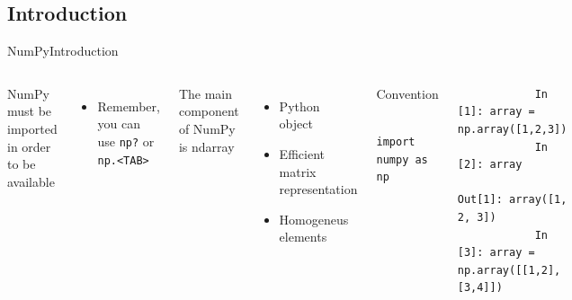 \documentclass[10pt,compress]{beamer} %
\begin{document}
\subsection{Introduction}
\begin{frame}[fragile]{NumPy}{Introduction}
	\begin{columns}
		NumPy must be imported in order to be available
		\begin{itemize}
			\item Remember, you can use \texttt{np?} or \texttt{np.<TAB>}
		\end{itemize}

		The main component of NumPy is \alert{ndarray}
		\begin{itemize}
			\item Python object
			\item Efficient matrix representation
			\item Homogeneus elements
		\end{itemize}

		\begin{block}{\footnotesize{Convention}}
		\vspace{-0.2cm} 
			\begin{lstlisting}
			import numpy as np
			\end{lstlisting}
		\vspace{-0.2cm} 
		\end{block}

		\begin{exampleblock}{}
		\vspace{-0.2cm} 
			\begin{lstlisting}
			In [1]: array = np.array([1,2,3])
			In [2]: array
			Out[1]: array([1, 2, 3])
			In [3]: array = np.array([[1,2],[3,4]])
			\end{lstlisting}
		\vspace{-0.2cm} 
		\end{exampleblock}
	\end{columns}

\end{frame}
\end{document}
